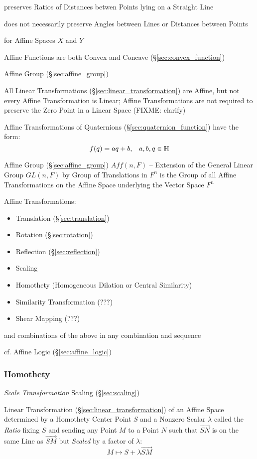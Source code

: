 preserves Ratios of Distances betwen Points lying on a Straight Line

does not necessarily preserve Angles between Lines or Distances
between Points

for Affine Spaces $X$ and $Y$

Affine Functions are both Convex and Concave (\S\ref{sec:convex_function})

\fist Affine Group (\S\ref{sec:affine_group})

\fist All Linear Transformations (\S\ref{sec:linear_transformation}) are
Affine, but not every Affine Transformation is Linear; Affine Transformations
are not required to preserve the Zero Point in a Linear Space (FIXME: clarify)

Affine Transformations of Quaternions (\S\ref{sec:quaternion_function}) have
the form:
\[
  f(q) = aq + b, \;\;\; a,b,q \in \mathbb{H}
\]

Affine Group (\S\ref{sec:affine_group}) $Aff(n,F)$ -- Extension of the General
Linear Group $GL(n,F)$ by Group of Translations in $F^n$ is the Group of all
Affine Transformations on the Affine Space underlying the Vector Space $F^n$

Affine Transformations:
\begin{itemize}
\item Translation (\S\ref{sec:translation})
\item Rotation (\S\ref{sec:rotation})
\item Reflection (\S\ref{sec:reflection})
\item Scaling
\item Homothety (Homogeneous Dilation or Central Similarity)
\item Similarity Transformation (???)
\item Shear Mapping (???)
\end{itemize}
and combinations of the above in any combination and sequence

cf. Affine Logic (\S\ref{sec:affine_logic})



\subsubsection{Homothety}\label{sec:homothety}


\emph{Scale Transformation} \fist Scaling (\S\ref{sec:scaling})

Linear Transformation (\S\ref{sec:linear_transformation}) of an Affine Space
determined by a Homothety Center Point $S$ and a Nonzero Scalar $\lambda$
called the \emph{Ratio} fixing $S$ and sending any Point $M$ to a Point $N$
such that $\vec{SN}$ is on the same Line as $\vec{SM}$ but \emph{Scaled} by a
factor of $\lambda$:
\[
  M \mapsto S + \lambda\vec{SM}
\]

